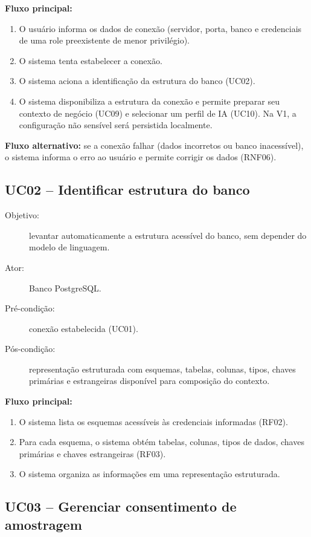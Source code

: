 \begin{apendicesenv}
\textbf{Fluxo principal:}
\begin{enumerate}
    \item O usuário informa os dados de conexão (servidor, porta, banco e credenciais de uma role preexistente de menor privilégio).
    \item O sistema tenta estabelecer a conexão.
    \item O sistema aciona a identificação da estrutura do banco (UC02).
    \item O sistema disponibiliza a estrutura da conexão e permite preparar seu contexto de negócio (UC09) e selecionar um perfil de IA (UC10). Na V1, a configuração não sensível será persistida localmente.
\end{enumerate}

\textbf{Fluxo alternativo:} se a conexão falhar (dados incorretos ou banco inacessível), o sistema informa o erro ao usuário e permite corrigir os dados (RNF06).

\subsection{UC02 -- Identificar estrutura do banco}

\begin{description}
    \item[Objetivo:] levantar automaticamente a estrutura acessível do banco, sem depender do modelo de linguagem.
    \item[Ator:] Banco PostgreSQL.
    \item[Pré-condição:] conexão estabelecida (UC01).
    \item[Pós-condição:] representação estruturada com esquemas, tabelas, colunas, tipos, chaves primárias e estrangeiras disponível para composição do contexto.
\end{description}

\textbf{Fluxo principal:}
\begin{enumerate}
    \item O sistema lista os esquemas acessíveis às credenciais informadas (RF02).
    \item Para cada esquema, o sistema obtém tabelas, colunas, tipos de dados, chaves primárias e chaves estrangeiras (RF03).
    \item O sistema organiza as informações em uma representação estruturada.
\end{enumerate}

\subsection{UC03 -- Gerenciar consentimento de amostragem}


\end{apendicesenv}
